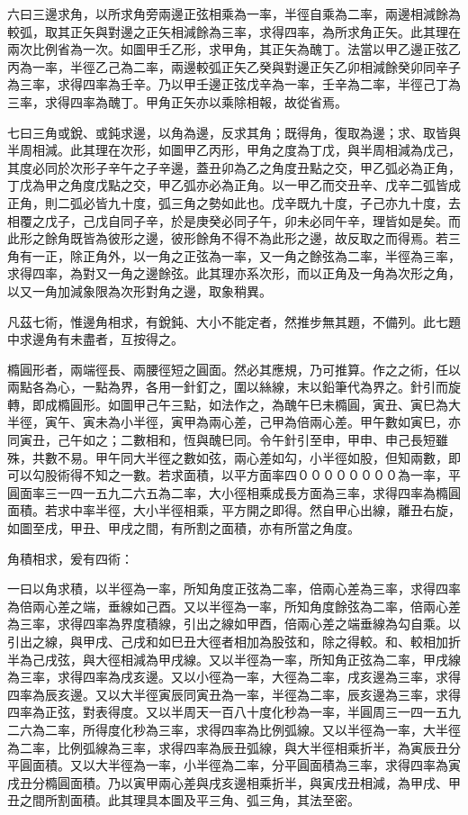 \begin{pinyinscope}
六曰三邊求角，以所求角旁兩邊正弦相乘為一率，半徑自乘為二率，兩邊相減餘為較弧，取其正矢與對邊之正矢相減餘為三率，求得四率，為所求角正矢。此其理在兩次比例省為一次。如圖甲壬乙形，求甲角，其正矢為醜丁。法當以甲乙邊正弦乙丙為一率，半徑乙己為二率，兩邊較弧正矢乙癸與對邊正矢乙卯相減餘癸卯同辛子為三率，求得四率為壬辛。乃以甲壬邊正弦戊辛為一率，壬辛為二率，半徑己丁為三率，求得四率為醜丁。甲角正矢亦以乘除相報，故從省焉。

七曰三角或銳、或鈍求邊，以角為邊，反求其角；既得角，復取為邊；求、取皆與半周相減。此其理在次形，如圖甲乙丙形，甲角之度為丁戊，與半周相減為戊己，其度必同於次形子辛午之子辛邊，蓋丑卯為乙之角度丑點之交，甲乙弧必為正角，丁戊為甲之角度戊點之交，甲乙弧亦必為正角。以一甲乙而交丑辛、戊辛二弧皆成正角，則二弧必皆九十度，弧三角之勢如此也。戊辛既九十度，子己亦九十度，去相覆之戊子，己戊自同子辛，於是庚癸必同子午，卯未必同午辛，理皆如是矣。而此形之餘角既皆為彼形之邊，彼形餘角不得不為此形之邊，故反取之而得焉。若三角有一正，除正角外，以一角之正弦為一率，又一角之餘弦為二率，半徑為三率，求得四率，為對又一角之邊餘弦。此其理亦系次形，而以正角及一角為次形之角，以又一角加減象限為次形對角之邊，取象稍異。

凡茲七術，惟邊角相求，有銳鈍、大小不能定者，然推步無其題，不備列。此七題中求邊角有未盡者，互按得之。

橢圓形者，兩端徑長、兩腰徑短之圓面。然必其應規，乃可推算。作之之術，任以兩點各為心，一點為界，各用一針釘之，圍以絲線，末以鉛筆代為界之。針引而旋轉，即成橢圓形。如圖甲己午三點，如法作之，為醜午巳未橢圓，寅丑、寅巳為大半徑，寅午、寅未為小半徑，寅甲為兩心差，己甲為倍兩心差。甲午數如寅巳，亦同寅丑，己午如之；二數相和，恆與醜巳同。令午針引至申，甲申、申己長短雖殊，共數不易。甲午同大半徑之數如弦，兩心差如勾，小半徑如股，但知兩數，即可以勾股術得不知之一數。若求面積，以平方面率四００００００００為一率，平圓面率三一四一五九二六五為二率，大小徑相乘成長方面為三率，求得四率為橢圓面積。若求中率半徑，大小半徑相乘，平方開之即得。然自甲心出線，離丑右旋，如圖至戌，甲丑、甲戌之間，有所割之面積，亦有所當之角度。

角積相求，爰有四術：

一曰以角求積，以半徑為一率，所知角度正弦為二率，倍兩心差為三率，求得四率為倍兩心差之端，垂線如己酉。又以半徑為一率，所知角度餘弦為二率，倍兩心差為三率，求得四率為界度積線，引出之線如甲酉，倍兩心差之端垂線為勾自乘。以引出之線，與甲戌、己戌和如巳丑大徑者相加為股弦和，除之得較。和、較相加折半為己戌弦，與大徑相減為甲戌線。又以半徑為一率，所知角正弦為二率，甲戌線為三率，求得四率為戌亥邊。又以小徑為一率，大徑為二率，戌亥邊為三率，求得四率為辰亥邊。又以大半徑寅辰同寅丑為一率，半徑為二率，辰亥邊為三率，求得四率為正弦，對表得度。又以半周天一百八十度化秒為一率，半圓周三一四一五九二六為二率，所得度化秒為三率，求得四率為比例弧線。又以半徑為一率，大半徑為二率，比例弧線為三率，求得四率為辰丑弧線，與大半徑相乘折半，為寅辰丑分平圓面積。又以大半徑為一率，小半徑為二率，分平圓面積為三率，求得四率為寅戌丑分橢圓面積。乃以寅甲兩心差與戌亥邊相乘折半，與寅戌丑相減，為甲戌、甲丑之間所割面積。此其理具本圖及平三角、弧三角，其法至密。


\end{pinyinscope}
